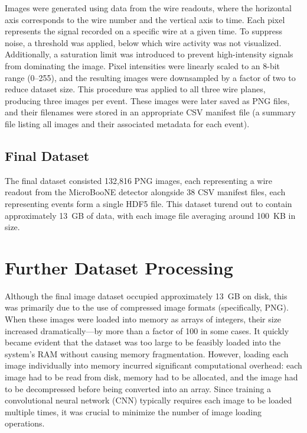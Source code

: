 \documentclass{pracalicmgr}
\begin{document}
Images were generated using data from the wire readouts, where the horizontal axis corresponds to the wire number and the vertical axis to time. Each pixel represents the signal recorded on a specific wire at a given time. To suppress noise, a threshold was applied, below which wire activity was not visualized. Additionally, a saturation limit was introduced to prevent high-intensity signals from dominating the image. Pixel intensities were linearly scaled to an 8-bit range (0--255), and the resulting images were downsampled by a factor of two to reduce dataset size. This procedure was applied to all three wire planes, producing three images per event. These images were later saved as PNG files, and their filenames were stored in an appropriate CSV manifest file (a summary file listing all images and their associated metadata for each event).

\subsection{Final Dataset}

The final dataset consisted 132,816 PNG images, each representing a wire readout from the MicroBooNE detector alongside 38 CSV manifest files, each representing events form a single HDF5 file. This dataset turend out to contain approximately 13~GB of data, with each image file averaging around 100~KB in size.

\section{Further Dataset Processing}

Although the final image dataset occupied approximately 13~GB on disk, this was primarily due to the use of compressed image formats (specifically, PNG). When these images were loaded into memory as arrays of integers, their size increased dramatically—by more than a factor of 100 in some cases. It quickly became evident that the dataset was too large to be feasibly loaded into the system's RAM without causing memory fragmentation. However, loading each image individually into memory incurred significant computational overhead: each image had to be read from disk, memory had to be allocated, and the image had to be decompressed before being converted into an array. Since training a convolutional neural network (CNN) typically requires each image to be loaded multiple times, it was crucial to minimize the number of image loading operations.
\end{document}
